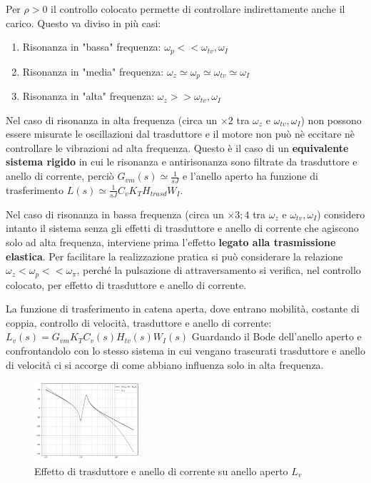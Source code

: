 Per \(\rho > 0\) il controllo colocato permette di controllare indirettamente anche il carico.
Questo va diviso in più casi:
\begin{enumerate}
    \item Risonanza in "bassa" frequenza: \(\omega_p << \omega_{tv}, \omega_I\)
    \item Risonanza in "media" frequenza: \(\omega_z \simeq \omega_p \simeq \omega_{tv} \simeq \omega_I\)
    \item Risonanza in "alta" frequenza: \(\omega_z >> \omega_{tv}, \omega_I\)
\end{enumerate} 

Nel caso di risonanza in alta frequenza (circa un \(\times 2\) tra \(\omega_z\) e \(\omega_{tv},\omega_I\)) non possono essere misurate le oscillazioni dal trasduttore e il motore non può nè eccitare nè controllare le vibrazioni ad alta frequenza. Questo è il caso di un \textbf{equivalente sistema rigido} in cui le risonanza e antirisonanza sono filtrate da trasduttore e anello di corrente, perciò \(G_{vm}(s) \simeq \frac{1}{sJ}\) e l'anello aperto ha funzione di trasferimento \(L(s) \simeq \frac{1}{sJ} C_v K_T H_{trasd} W_I\).

Nel caso di risonanza in bassa frequenza (circa un \(\times 3;4\) tra \(\omega_z\) e \(\omega_{tv}, \omega_I\)) considero intanto il sistema senza gli effetti di trasduttore e anello di corrente che agiscono solo ad alta frequenza, interviene prima l'effetto \textbf{legato alla trasmissione elastica}.
Per facilitare la realizzazione pratica si può considerare la relazione \(\omega_z < \omega_p << \omega_\pi\), perché la pulsazione di attraversamento si verifica, nel controllo colocato, per effetto di trasduttore e anello di corrente.

La funzione di trasferimento in catena aperta, dove entrano mobilità, costante di coppia, controllo di velocità, trasduttore e anello di corrente: 
\(L_v(s) = G_{vm}K_T C_v(s) H_{tv}(s) W_I(s)\)
Guardando il Bode dell'anello aperto e confrontandolo con lo stesso sistema in cui vengano trascurati trasduttore e anello di velocità ci si accorge di come abbiano influenza solo in alta frequenza.

\begin{figure}[h]
    \centering
    \includegraphics[width=0.35\textwidth]{Immagini/risonanza_bassa_f_Gvm_vs_Lv.png}
    \caption{Effetto di trasduttore e anello di corrente su anello aperto \(L_v\)}
\end{figure}

